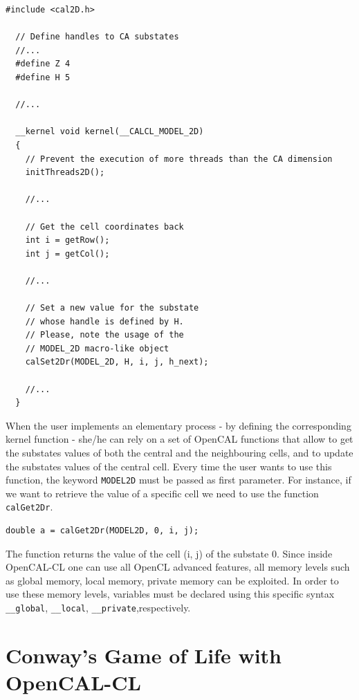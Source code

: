 \begin{lstlisting}[float,floatplacement=H, label=lst:OpenCAL-CL-kernel, caption=Example of OpenCAL-CL kernel.] 
  #include <cal2D.h>

  // Define handles to CA substates
  //...
  #define Z 4
  #define H 5

  //...
  
  __kernel void kernel(__CALCL_MODEL_2D)
  {
    // Prevent the execution of more threads than the CA dimension
    initThreads2D();

    //...

    // Get the cell coordinates back
    int i = getRow();
    int j = getCol();

    //...

    // Set a new value for the substate
    // whose handle is defined by H.
    // Please, note the usage of the
    // MODEL_2D macro-like object
    calSet2Dr(MODEL_2D, H, i, j, h_next);
    
    //...
  }
\end{lstlisting}

When the user implements an elementary process - by defining
the corresponding kernel function - she/he can rely on a set of OpenCAL functions
that allow to get the substates values of both the central and the
neighbouring cells, and to update the substates values of the central
cell. Every time the user wants to use this function, the keyword \verb'MODEL2D' must be passed
as first parameter. For instance, if we
want to retrieve the value of a specific cell we need to use the function
\verb'calGet2Dr'.

\begin{lstlisting}[numbers=none] 
	double a = calGet2Dr(MODEL2D, 0, i, j);
\end{lstlisting}

The function returns the value of the cell (i, j) of the substate
0. Since inside OpenCAL-CL one can use all OpenCL advanced features, all
memory levels such as global memory, local memory, private memory
can be exploited. In order to use these memory
levels, variables must be declared using this specific syntax
\verb'__global', \verb'__local', \verb'__private',respectively.

\section{Conway's Game of Life with OpenCAL-CL}
 

